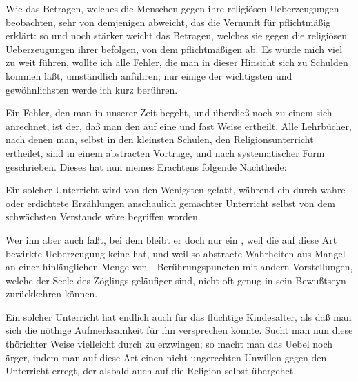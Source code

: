 Wie das Betragen, welches die Menschen gegen ihre  religiösen Ueberzeugungen beobachten, sehr von demjenigen abweicht, das die Vernunft für pflichtmäßig erklärt: so und noch stärker weicht das Betragen, welches sie gegen die religiösen Ueberzeugungen ihrer  befolgen, von dem pflichtmäßigen ab. Es würde mich viel zu weit führen, wollte ich alle Fehler, die man in dieser Hinsicht sich zu Schulden kommen läßt, umständlich anführen; nur einige der wichtigsten und gewöhnlichsten werde ich kurz berühren.\par
Ein Fehler, den man in unserer Zeit  begeht, und überdieß noch zu einem  sich anrechnet, ist der, daß man den  auf eine  und fast  Weise ertheilt. Alle Lehrbücher, nach denen man, selbst in den kleinsten Schulen, den Religionsunterricht ertheilet, sind in einem abstracten Vortrage, und nach systematischer Form geschrieben. Dieses hat nun meines Erachtens folgende Nachtheile:
\begin{aufza}
\item Ein solcher Unterricht wird von den Wenigsten gefaßt, während ein durch wahre oder erdichtete Erzählungen anschaulich gemachter Unterricht selbst von dem schwächsten Verstande wäre begriffen worden.
\item Wer ihn aber auch faßt, bei dem bleibt er doch nur ein , weil die auf diese Art bewirkte Ueberzeugung keine  hat, und weil so abstracte Wahrheiten aus Mangel an einer hinlänglichen Menge von~\ Berührungspuncten mit andern Vorstellungen, welche der Seele des Zöglings geläufiger sind, nicht oft genug in sein Bewußtseyn zurückkehren können.
\item Ein solcher Unterricht hat endlich auch  für das flüchtige Kindesalter, als daß man sich die nöthige Aufmerksamkeit für ihn versprechen könnte. Sucht man nun diese thörichter Weise vielleicht durch  zu erzwingen; so macht man das Uebel noch ärger, indem man auf diese Art einen nicht ungerechten Unwillen gegen den Unterricht erregt, der alsbald auch auf die Religion selbst übergehet.
\end{aufza}

